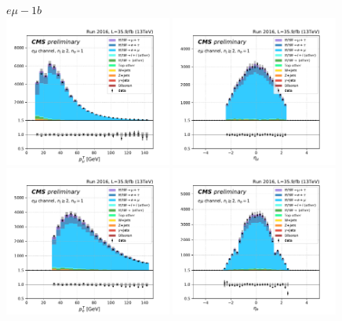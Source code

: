 \begin{figure}[ht]
    \centering
    $e \mu - 1b$ \\
    \includegraphics[width=0.49\textwidth]{chapters/Appendix/sectionPlots/figures/kinematics_pickles/emu2/1b/emu2_1b_lepton1_pt.pdf}
    \includegraphics[width=0.49\textwidth]{chapters/Appendix/sectionPlots/figures/kinematics_pickles/emu2/1b/emu2_1b_lepton1_eta.pdf}
    \includegraphics[width=0.49\textwidth]{chapters/Appendix/sectionPlots/figures/kinematics_pickles/emu2/1b/emu2_1b_lepton2_pt.pdf}
    \includegraphics[width=0.49\textwidth]{chapters/Appendix/sectionPlots/figures/kinematics_pickles/emu2/1b/emu2_1b_lepton2_eta.pdf}

\end{figure}
